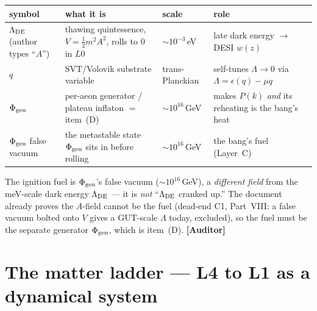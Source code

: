 \documentclass[11pt]{article}
\newcommand{\Auditor}{\textbf{\textcolor{teal!55!black}{[Auditor]}}}
\begin{document}
\begin{center}\small
\begin{tabular}{@{}p{}p{}p{}p{}@{}}\toprule
symbol & what it is & scale & role\\\midrule
$\Lambda_{\rm DE}$ (author types ``$A$'') & thawing quintessence, $V=\tfrac12 m^2A^2$, rolls to $0$ in $L0$ & $\sim10^{-3}$\,eV & late dark energy $\to$ DESI $w(z)$\\
$q$ & SVT/Volovik substrate variable & trans-Planckian & self-tunes $\Lambda\to0$ via $\Lambda=\epsilon(q)-\mu q$\\
$\Phi_{\rm gen}$ & per-aeon generator / plateau inflaton $=$ item~(D) & $\sim10^{16}$\,GeV & makes $P(k)$ \emph{and} its reheating is the bang's heat\\
$\Phi_{\rm gen}$ false vacuum & the metastable state $\Phi_{\rm gen}$ sits in before rolling & $\sim10^{16}$\,GeV & the bang's fuel (Layer~C)\\
\bottomrule
\end{tabular}
\end{center}
The ignition fuel is $\Phi_{\rm gen}$'s false vacuum ($\sim10^{16}$\,GeV), a \emph{different field} from the meV-scale dark energy $\Lambda_{\rm DE}$ --- it is \emph{not} ``$\Lambda_{\rm DE}$ cranked up.'' The document already proves the $A$-field cannot be the fuel (dead-end C1, Part~VIII: a false vacuum bolted onto $V$ gives a GUT-scale $\Lambda$ today, excluded), so the fuel must be the separate generator $\Phi_{\rm gen}$, which is item~(D). \Auditor

\clearpage

\part{The matter ladder --- L4 to L1 as a dynamical system}
\setcounter{section}{0}\setcounter{equation}{0}\setcounter{figure}{0}

\end{document}
